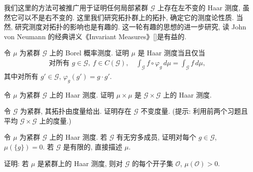 \documentclass[../../main.tex]{subfiles}
\begin{document}
我们这里的方法可被推广用于证明任何局部紧群 $\mathcal{G}$ 上存在左不变的 Haar 测度, 虽然它可以不是右不变的. 这里我们研究拓扑群上的拓扑, 确定它的测度论性质. 当然, 研究测度对拓扑的影响也是有趣的. 这一轮有趣的思想的进一步研究, 读 John von Neumann 的经典讲义《Invariant Measures》[\cite{vN91}]是有益的.

\begin{exercise}\label{exercise:ch22-19}
令 $\mu$ 为紧群 $\mathcal{G}$ 上的 Borel 概率测度. 证明 $\mu$ 是 Haar 测度当且仅当
\begin{align*}
\text{对所有 }g\in\mathcal{G},\ f\in C(\mathcal{G}),\quad\int_{\mathcal{G}}f\circ\varphi_{g}\,d\mu=\int_{\mathcal{G}}f\,d\mu,
\end{align*}
其中对所有 $g'\in\mathcal{G}$, $\varphi_{g}(g')=g\cdot g'$.
\end{exercise}

\begin{exercise}\label{exercise:ch22-20}
令 $\mu$ 为紧群 $\mathcal{G}$ 上的 Haar 测度. 证明 $\mu\times\mu$ 是 $\mathcal{G}\times\mathcal{G}$ 上的 Haar 测度.
\end{exercise}

\begin{exercise}\label{exercise:ch22-21}
令 $\mathcal{G}$ 为紧群, 其拓扑由度量给出. 证明存在 $\mathcal{G}$ 不变度量. (提示: 利用前两个习题且平均 $\mathcal{G}\times\mathcal{G}$ 上的度量.)
\end{exercise}

\begin{exercise}\label{exercise:ch22-22}
令 $\mu$ 为紧群 $\mathcal{G}$ 上的 Haar 测度. 若 $\mathcal{G}$ 有无穷多成员, 证明对每个 $g\in\mathcal{G}$, $\mu(\{g\})=0$. 若 $\mathcal{G}$ 是有限的, 直接描述 $\mu$.
\end{exercise}

\begin{exercise}\label{exercise:ch22-23}
证明: 若 $\mu$ 是紧群上的 Haar 测度, 则对 $\mathcal{G}$ 的每个开子集 $\mathcal{O}$, $\mu(\mathcal{O})>0$.
\end{exercise}
\end{document}
